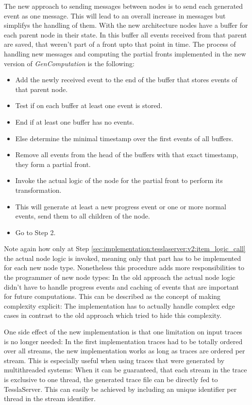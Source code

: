 The new approach to sending messages between nodes is to send each generated event as one message.
This will lead to an overall increase in messages but simplifys the handling of them.
With the new architecture nodes have a buffer for each parent node in their state.
In this buffer all events received from that parent are saved, that weren't part of a front upto that point in time.
The process of handling new messages and computing the partial fronts implemented in the new version of \emph{GenComputation} is the following:

\begin{itemize}
  \item Add the newly received event to the end of the buffer that stores events of that parent node.
  \item Test if on each buffer at least one event is stored.
  \item End if at least one buffer has no events.
  \item Else determine the minimal timestamp over the first events of all buffers.
  \item Remove all events from the head of the buffers with that exact timestamp, they form a partial front.
  \item\label{sec:implementation:tesslaserver:v2:item_logic_call} Invoke the actual logic of the node for the partial front to perform its transformation.
  \item This will generate at least a new progress event or one or more normal events, send them to all children of the node.
  \item Go to Step 2.
\end{itemize}

Note again how only at Step \ref{sec:implementation:tesslaserver:v2:item_logic_call} the actual node logic is invoked, meaning only that part has to be implemented for each new node type.
Nonetheless this procedure adds more responsibilities to the programmer of new node types:
In the old approach the actual node logic didn't have to handle progress events and caching of events that are important for future computations.
This can be described as the concept of making complexity explicit: The implementation has to actually handle complex edge cases in contrast to the old approach which tried to hide this complexity.

One side effect of the new implementation is that one limitation on input traces is no longer needed:
In the first implementation traces had to be totally ordered over all streams, the new implementation works as long as traces are ordered per stream.
This is especially useful when using traces that were generated by multithreaded systems: When it can be guaranteed, that each stream in the trace is exclusive to one thread, the generated trace file can be directly fed to TesslaServer.
This can easily be achieved by including an unique identifier per thread in the stream identifier.

